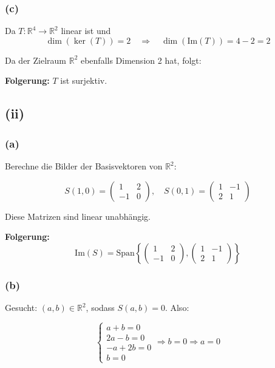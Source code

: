 \documentclass{article}
\begin{document}
\subsubsection*{(c)}
Da \( T: \mathbb{R}^4 \rightarrow \mathbb{R}^2 \) linear ist und 
\[
\dim(\ker(T)) = 2 \quad \Rightarrow \quad \dim(\text{Im}(T)) = 4 - 2 = 2
\]

Da der Zielraum \( \mathbb{R}^2 \) ebenfalls Dimension 2 hat, folgt:

\textbf{Folgerung:} \( T \) ist surjektiv.


\subsection*{(ii)}
\subsubsection*{(a)}
Berechne die Bilder der Basisvektoren von \( \mathbb{R}^2 \):

\[
S(1, 0) = 
\begin{pmatrix}
1 & 2 \\
-1 & 0
\end{pmatrix}, \quad
S(0, 1) = 
\begin{pmatrix}
1 & -1 \\
2 & 1
\end{pmatrix}
\]

Diese Matrizen sind linear unabhängig.

\textbf{Folgerung:}
\[
\text{Im}(S) = \text{Span} \left\{
\begin{pmatrix}
1 & 2 \\
-1 & 0
\end{pmatrix},
\begin{pmatrix}
1 & -1 \\
2 & 1
\end{pmatrix}
\right\}
\]

\subsubsection*{(b)}

Gesucht: \( (a, b) \in \mathbb{R}^2 \), sodass \( S(a, b) = 0 \). Also:

\[
\begin{cases}
a + b = 0 \\
2a - b = 0 \\
-a + 2b = 0 \\
b = 0
\end{cases}
\Rightarrow b = 0 \Rightarrow a = 0
\]
\end{document}
